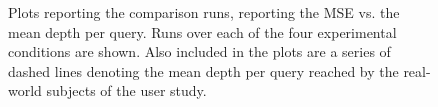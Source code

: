 \begin{figure}[p!]
    \centering
    \caption[Real-world comparisons over stopping strategies]{Plots reporting the comparison runs, reporting the MSE vs. the mean depth per query. Runs over each of the four experimental conditions are shown. Also included in the plots are a series of dashed lines denoting the mean depth per query reached by the real-world subjects of the user study.}
    \label{fig:ch8_sim_comparison_plots}
\end{figure}

